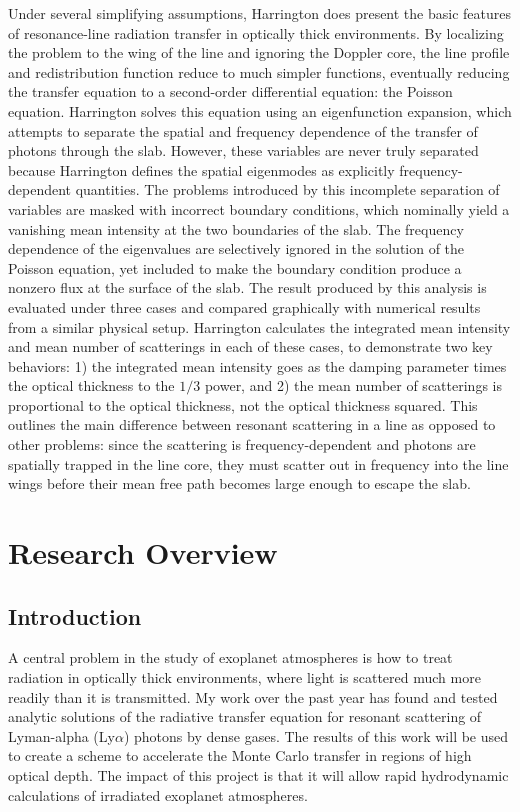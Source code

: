 \documentclass[onecolumn]{aastex63}
\begin{document}
Under several simplifying assumptions, Harrington does present the basic features of resonance-line radiation transfer in optically thick environments. By localizing the problem to the wing of the line and ignoring the Doppler core, the line profile and redistribution function reduce to much simpler functions, eventually reducing the transfer equation to a second-order differential equation: the Poisson equation. Harrington solves this equation using an eigenfunction expansion, which attempts to separate the spatial and frequency dependence of the transfer of photons through the slab. However, these variables are never truly separated because Harrington defines the spatial eigenmodes as explicitly frequency-dependent quantities. The problems introduced by this incomplete separation of variables are masked with incorrect boundary conditions, which nominally yield a vanishing mean intensity at the two boundaries of the slab. The frequency dependence of the eigenvalues are selectively ignored in the solution of the Poisson equation, yet included to make the boundary condition produce a nonzero flux at the surface of the slab. The result produced by this analysis is evaluated under three cases and compared graphically with numerical results from a similar physical setup. Harrington calculates the integrated mean intensity and mean number of scatterings in each of these cases, to demonstrate two key behaviors: 1) the integrated mean intensity goes as the damping parameter times the optical thickness to the $1/3$ power, and 2) the mean number of scatterings is proportional to the optical thickness, not the optical thickness squared. This outlines the main difference between resonant scattering in a line as opposed to other problems: since the scattering is frequency-dependent and photons are spatially trapped in the line core, they must scatter out in frequency into the line wings before their mean free path becomes large enough to escape the slab.

\newpage
\section{Research Overview} \label{researchoverview}

\subsection{Introduction}

 A central problem in the study of exoplanet atmospheres is how to treat radiation in optically thick environments, where light is scattered much more readily than it is transmitted. My work over the past year has found and tested analytic solutions of the radiative transfer equation for resonant scattering of Lyman-alpha (Ly$\alpha$) photons by dense gases. The results of this work will be used to create a scheme to accelerate the Monte Carlo transfer in regions of high optical depth. The impact of this project is that it will allow rapid hydrodynamic calculations of irradiated exoplanet atmospheres.
\end{document}
